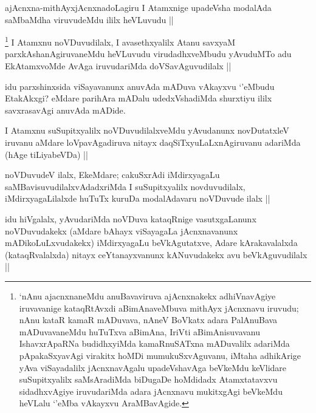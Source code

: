 
\begin{artha}
ajAcnxna-mithAyxjAcnxnadoLagiru I Atamxnige upadeVsha modalAda saMbaMdha viruvudeMdu ililx heVLuvudu ||
\end{artha}


\begin{artha}
\footnote{`nAnu ajacnxnaneMdu anuBavaviruva ajAcnxnakekx adhiVnavAgiye iruvavanige kataqRtAvxdi aBimAnaveMbuva mithAyx jAcnxnavu iruvudu; nAnu kataR kamaR mADuvava, nAneV BoVkatx adara PalAnuBava mADuvavaneMdu huTuTxva aBimAna, IriVti aBimAnisuvavanu IshavxrApaRNa budidhxyiMda kamaRnuSATxna mADuvalilx adariMda pApakaSxyavAgi virakitx hoMDi mumukuSxvAguvanu, iMtaha adhikArige yAva viSayadalilx jAcnxnavAgalu upadeVshavAga beVkeMdu keVlidare suSupitxyalilx saMsAradiMda biDugaDe hoMdidadx Atamxtatavxvu sidadhxvAgiye iruvudariMda adara jAcnxnavu mukitxgAgi beVkeMdu heVLalu `\stext'eMba vAkayxvu AraMBavAgide.}
I Atamxnu noVDuvudilalx, I avasethxyalilx Atanu savxyaM parxkAshanAgiruvaneMdu heVLuvudu virudadhxveMbudu yAvuduMTo adu EkAtamxvoMde AvAga iruvudariMda doVSavAguvudilalx ||
\end{artha}

\begin{artha}
idu parxshinxsida viSayavanunx anuvAda mADuva vAkayxvu `\stext'eMbudu EtakAkxgi? eMdare parihAra mADalu udedxVshadiMda shurxtiyu ililx savxrasavAgi anuvAda mADide.
\end{artha}


\begin{artha}
I Atamxnu suSupitxyalilx noVDuvudilalxveMdu yAvudanunx novDutatxleV iruvanu aMdare loVpavAgadiruva nitayx daqSiTxyuLaLxnAgiruvanu adariMda (hAge tiLiyabeVDa) ||
\end{artha}


\begin{artha}
noVDuvudeV ilalx, EkeMdare; cakuSxrAdi iMdirxyagaLu saMBavisuvudilalxvAdadxriMda I suSupitxyalilx novduvudilalx, iMdirxyagaLilalxde huTuTx kuruDa modalAdavaru noVDuvude ilalx ||
\end{artha}


\begin{artha}
idu hiVgalalx, yAvudariMda noVDuva kataqRnige vasutxgaLanunx noVDuvudakekx (aMdare bAhayx viSayagaLa jAcnxnavanunx mADikoLuLxvudakekx) iMdirxyagaLu beVkAgutatxve, Adare kArakavalalxda (kataqRvalalxda) nitayx ceYtanayxvanunx kANuvudakekx avu beVkAguvudilalx ||
\end{artha}


